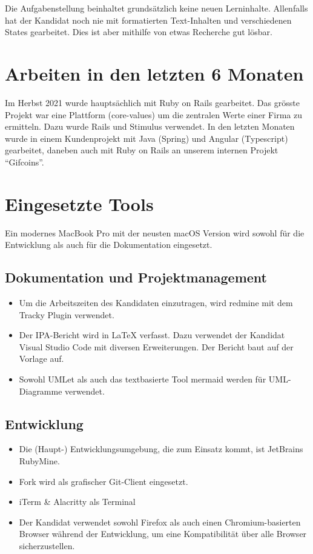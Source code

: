 Die Aufgabenstellung beinhaltet grundsätzlich keine neuen Lerninhalte. Allenfalls hat der Kandidat noch nie mit formatierten Text-Inhalten und verschiedenen States gearbeitet. Dies ist aber mithilfe von etwas Recherche gut lösbar.

\section{Arbeiten in den letzten 6 Monaten}

Im Herbst 2021 wurde hauptsächlich mit Ruby on Rails gearbeitet. Das grösste Projekt war eine Plattform (core-values) um die zentralen Werte einer Firma zu ermitteln.
Dazu wurde Rails und Stimulus verwendet. In den letzten Monaten wurde in einem Kundenprojekt mit Java (Spring) und Angular (Typescript) gearbeitet, daneben auch mit Ruby on Rails an unserem internen Projekt “Gifcoins”.

\section{Eingesetzte Tools}

Ein modernes MacBook Pro mit der neusten macOS Version wird sowohl für die Entwicklung als auch für die Dokumentation eingesetzt.

\subsection{Dokumentation und Projektmanagement}

\begin{itemize}
    \item Um die Arbeitszeiten des Kandidaten einzutragen, wird redmine mit dem Tracky Plugin verwendet.
    \item Der IPA-Bericht wird in LaTeX verfasst. Dazu verwendet der Kandidat Visual Studio Code mit diversen Erweiterungen.
          Der Bericht baut auf der Vorlage \cite{Buhler_ipa-template_2022} auf.
    \item Sowohl UMLet als auch das textbasierte Tool mermaid werden für UML-Diagramme verwendet.
\end{itemize}

\subsection{Entwicklung}

\begin{itemize}
    \item Die (Haupt-) Entwicklungsumgebung, die zum Einsatz kommt, ist JetBrains RubyMine.
    \item Fork wird als grafischer Git-Client eingesetzt.
    \item iTerm \& Alacritty als Terminal
    \item Der Kandidat verwendet sowohl Firefox als auch einen Chromium-basierten Browser während der Entwicklung, um eine Kompatibilität über alle Browser sicherzustellen.
\end{itemize}
